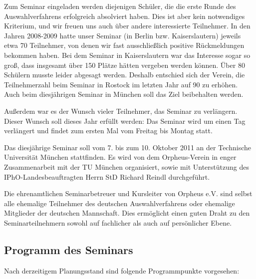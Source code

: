 \documentclass[DIV13,11pt,a4paper,headinclude]{scrartcl}
\begin{document}
Zum Seminar eingeladen werden diejenigen Sch\"uler, die die erste Runde des
Auswahlverfahrens erfolgreich absolviert haben. Dies ist aber kein notwendiges
Kriterium, und wir freuen uns auch \"uber andere interessierte Teilnehmer. In den
Jahren 2008-2009 hatte unser Seminar (in Berlin bzw. Kaiserslautern) jeweils etwa 70
Teilnehmer, von denen wir fast ausschlie\ss lich positive R\"uckmeldungen bekommen
haben. Bei dem Seminar in Kaiserslautern war das Interesse sogar so gro\ss , dass 
insgesamt \"uber 150 Pl\"atze h\"atten vergeben werden k\"onnen. \"Uber 80 Sch\"ulern musste leider abgesagt werden. 
Deshalb entschied sich der Verein, die 
Teilnehmerzahl beim Seminar in Rostock im letzten Jahr auf 90 zu erh\"ohen. Auch beim diesj\"ahrigen Seminar in M\"unchen soll das Ziel beibehalten werden.

Au\ss erdem war es der Wunsch vieler Teilnehmer, das Seminar zu verl\"angern. Dieser Wunsch soll dieses Jahr erf\"ullt werden: Das Seminar wird um einen Tag verl\"angert und findet zum ersten Mal vom Freitag bis Montag statt.

Das diesj\"ahrige Seminar soll vom 7. bis zum 10. Oktober 2011 an der Technische Universit\"at M\"unchen stattfinden. Es wird von dem Orpheus-Verein in enger Zusammenarbeit mit der TU M\"unchen organisiert, sowie mit Unterst\"utzung des IPhO-Landesbeauftragten Herrn StD Richard Reindl durchgef\"uhrt.

Die ehrenamtlichen Seminarbetreuer und Kursleiter von Orpheus e.V. sind selbst
alle ehemalige Teilnehmer des deutschen Auswahlverfahrens oder ehemalige
Mitglieder der deutschen Mannschaft. Dies erm\"oglicht einen guten Draht zu den
Seminarteilnehmern sowohl auf fachlicher als auch auf pers\"onlicher Ebene.

\subsection*{Programm des Seminars}

Nach derzeitigem Planungsstand sind folgende Programmpunkte vorgesehen:
\end{document}
